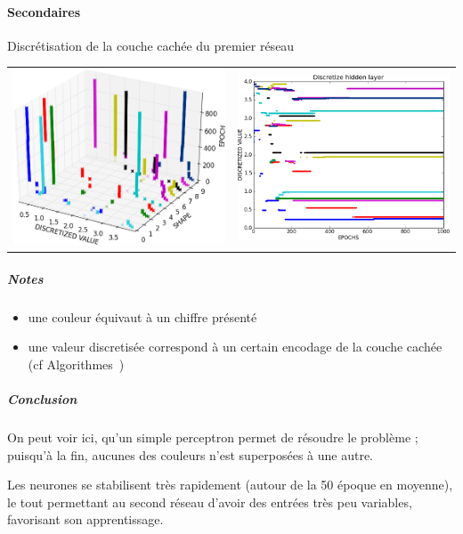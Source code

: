     \paragraph{Secondaires}
      Discrétisation de la couche cachée du premier réseau
      \begin{center}
	\begin{tabular}{lr}
	  \hspace*{-1cm}
	  \includegraphics[width=250px]{data/expA1/discretize_cloud.png}
	  &
	  \includegraphics[width=250px]{data/expA1/discretize.png} 
	\end{tabular}
      \end{center} 
      \subparagraph{Notes}
	\begin{itemize}
	  \item une couleur équivaut à un chiffre présenté
	  \item une valeur discretisée correspond à un certain encodage de la couche cachée (cf Algorithmes~)
	\end{itemize}
      \subparagraph{Conclusion}
        On peut voir ici, qu'un simple perceptron permet de résoudre le problème ; puisqu'à la fin,
        aucunes des couleurs n'est superposées à une autre.
        
	Les neurones se stabilisent très rapidement (autour de la 50 époque en moyenne), 
	le tout permettant au second réseau d'avoir des entrées très peu variables, favorisant
	son apprentissage.
